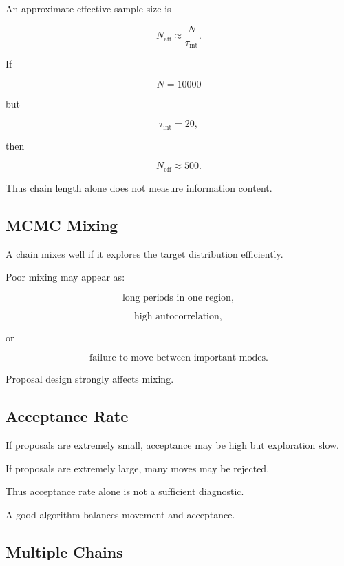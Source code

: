 An approximate effective sample size is

\[
\boxed{
N_{\mathrm{eff}}
\approx
\frac{
N
}{
\tau_{\mathrm{int}}
}.
}
\]

If

\[
N=10000
\]

but

\[
\tau_{\mathrm{int}}=20,
\]

then

\[
N_{\mathrm{eff}}
\approx500.
\]

Thus chain length alone does not measure information content.

\subsection{MCMC Mixing}
\label{subsec:mcmc-mixing}

A chain mixes well if it explores the target distribution efficiently.

Poor mixing may appear as:

\[
\boxed{
\text{long periods in one region},
}
\]

\[
\boxed{
\text{high autocorrelation},
}
\]

or

\[
\boxed{
\text{failure to move between important modes}.
}
\]

Proposal design strongly affects mixing.

\subsection{Acceptance Rate}
\label{subsec:mcmc-acceptance-rate}

If proposals are extremely small, acceptance may be high but exploration
slow.

If proposals are extremely large, many moves may be rejected.

Thus acceptance rate alone is not a sufficient diagnostic.

A good algorithm balances movement and acceptance.

\subsection{Multiple Chains}
\label{subsec:mcmc-multiple-chains}

